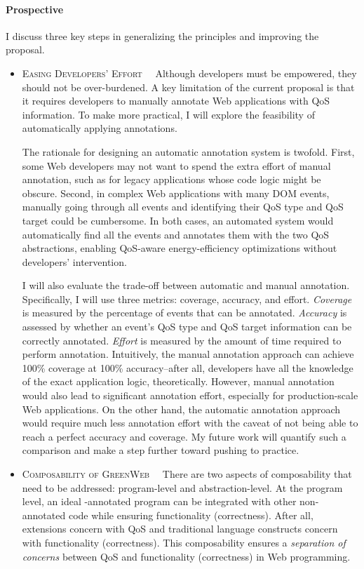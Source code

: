 \paragraph{Prospective} I discuss three key steps in generalizing the principles and improving the proposal.

\begin{itemize}
  \item \textsc{Easing Developers' Effort~~} Although developers must be empowered, they should not be over-burdened. A key limitation of the current \greenweb proposal is that it requires developers to manually annotate Web applications with QoS information. To make \greenweb more practical, I will explore the feasibility of automatically applying \greenweb annotations.
  
  The rationale for designing an automatic annotation system is twofold. First, some Web developers may not want to spend the extra effort of manual annotation, such as for legacy applications whose code logic might be obscure. Second, in complex Web applications with many DOM events, manually going through all events and identifying their QoS type and QoS target could be cumbersome. In both cases, an automated system would automatically find all the events and annotates them with the two QoS abstractions, enabling QoS-aware energy-efficiency optimizations without developers' intervention.
  
  I will also evaluate the trade-off between automatic and manual annotation. Specifically, I will use three metrics: coverage, accuracy, and effort. \textit{Coverage} is measured by the percentage of events that can be annotated. \textit{Accuracy} is assessed by whether an event's QoS type and QoS target information can be correctly annotated. \textit{Effort} is measured by the amount of time required to perform annotation. Intuitively, the manual annotation approach can achieve 100\% coverage at 100\% accuracy--after all, developers have all the knowledge of the exact application logic, theoretically. However, manual annotation would also lead to significant annotation effort, especially for production-scale Web applications. On the other hand, the automatic annotation approach would require much less annotation effort with the caveat of not being able to reach a perfect accuracy and coverage. My future work will quantify such a comparison and make a step further toward pushing \greenweb to practice.
 
  \item \textsc{Composability of GreenWeb~~} There are two aspects of composability that need to be addressed: program-level and abstraction-level. At the program level, an ideal \greenweb-annotated program can be integrated with other non-annotated code while ensuring functionality (correctness). After all, \greenweb extensions concern with QoS and traditional language constructs concern with functionality (correctness). This composability ensures a \textit{separation of concerns} between QoS and functionality (correctness) in Web programming.
  

\end{itemize}
